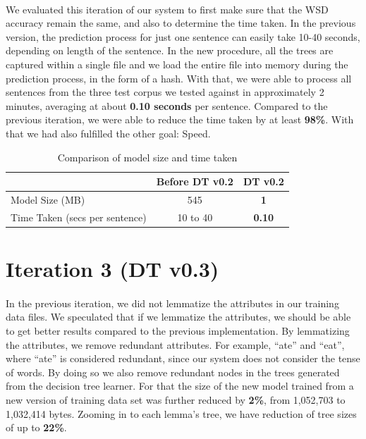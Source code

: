 \paragraph{}
We evaluated this iteration of our system to first make sure that the WSD accuracy remain the same, and also to determine the time taken. In the previous version, the prediction process for just one sentence can easily take 10-40 seconds, depending on length of the sentence. In the new procedure, all the trees are captured within a single file and we load the entire file into memory during the prediction process, in the form of a hash. With that, we were able to process all sentences from the three test corpus we tested against in approximately 2 minutes, averaging at about \textbf{0.10 seconds} per sentence. Compared to the previous iteration, we were able to reduce the time taken by at least \textbf{98\%}. With that we had also fulfilled the other goal: Speed.

\begin{table}[h]
	\center
	\begin{tabular}{| l | c | c |}
		\hline
		& Before DT v0.2 & DT v0.2\\
		\hline
		Model Size (MB) & 545 & \textbf{\large{1}} \\
		\hline
		Time Taken (secs per sentence) & 10 to 40 & \textbf{\large{0.10}} \\
		\hline
	\end{tabular}
	\caption{Comparison of model size and time taken}
	\label{tab:spaceandtime}
\end{table}

\section{Iteration 3 (DT v0.3)}
\label{it:3}
\paragraph{}
In the previous iteration, we did not lemmatize the attributes in our training data files. We speculated that if we lemmatize the attributes, we should be able to get better results compared to the previous implementation. By lemmatizing the attributes, we remove redundant attributes. For example, ``ate'' and ``eat'', where ``ate'' is considered redundant, since our system does not consider the tense of words. By doing so we also remove redundant nodes in the trees generated from the decision tree learner. For that the size of the new model trained from a new version of training data set was further reduced by \textbf{2\%}, from 1,052,703 to 1,032,414 bytes. Zooming in to each lemma's tree, we have reduction of tree sizes of up to \textbf{22\%}.

